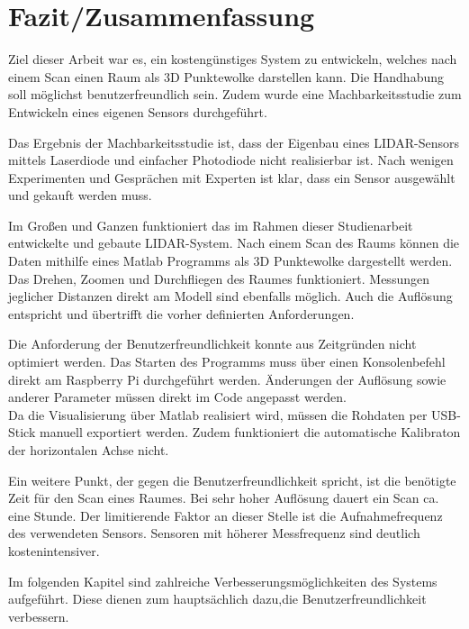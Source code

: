 \chapter{Fazit/Zusammenfassung}

Ziel dieser Arbeit war es, ein kostengünstiges System zu entwickeln, welches nach einem Scan einen Raum als 3D Punktewolke darstellen kann. Die Handhabung soll möglichst benutzerfreundlich sein. Zudem wurde eine Machbarkeitsstudie zum Entwickeln eines eigenen Sensors durchgeführt.

Das Ergebnis der Machbarkeitsstudie ist, dass der Eigenbau eines \ac{LIDAR}-Sensors mittels Laserdiode und einfacher Photodiode nicht realisierbar ist. Nach wenigen Experimenten und Gesprächen mit Experten ist klar, dass ein Sensor ausgewählt und gekauft werden muss.

Im Großen und Ganzen funktioniert das im Rahmen dieser Studienarbeit entwickelte und gebaute \ac{LIDAR}-System. Nach einem Scan des Raums können die Daten mithilfe eines Matlab Programms als 3D Punktewolke dargestellt werden. Das Drehen, Zoomen und Durchfliegen des Raumes funktioniert. Messungen jeglicher Distanzen direkt am Modell sind ebenfalls möglich. Auch die Auflösung entspricht und übertrifft die vorher definierten Anforderungen.


Die Anforderung der Benutzerfreundlichkeit konnte aus Zeitgründen nicht optimiert werden. Das Starten des Programms muss über einen Konsolenbefehl direkt am Raspberry Pi durchgeführt werden. Änderungen der Auflösung sowie anderer Parameter müssen direkt im Code angepasst werden.\\
Da die Visualisierung über Matlab realisiert wird, müssen die Rohdaten per USB-Stick manuell exportiert werden. Zudem funktioniert die automatische Kalibraton der horizontalen Achse nicht.

Ein weitere Punkt, der gegen die Benutzerfreundlichkeit spricht, ist die benötigte Zeit für den Scan eines Raumes. Bei sehr hoher Auflösung dauert ein Scan ca. eine Stunde. Der limitierende Faktor an dieser Stelle ist die Aufnahmefrequenz des verwendeten Sensors. Sensoren mit höherer Messfrequenz sind deutlich kostenintensiver.

Im folgenden Kapitel sind zahlreiche Verbesserungsmöglichkeiten des Systems aufgeführt. Diese dienen zum hauptsächlich dazu,die Benutzerfreundlichkeit verbessern.


